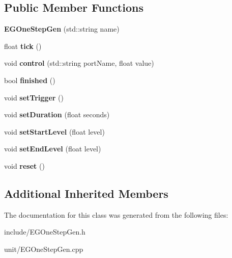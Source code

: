 \subsection*{Public Member Functions}
\begin{DoxyCompactItemize}
\item 
{\bfseries E\+G\+One\+Step\+Gen} (std\+::string name)\hypertarget{classunit_1_1EGOneStepGen_a9bc697acabed6c7b0467369ba073ede1}{}\label{classunit_1_1EGOneStepGen_a9bc697acabed6c7b0467369ba073ede1}

\item 
float {\bfseries tick} ()\hypertarget{classunit_1_1EGOneStepGen_a74df96649d7a66d19cb33bf9bf13f54a}{}\label{classunit_1_1EGOneStepGen_a74df96649d7a66d19cb33bf9bf13f54a}

\item 
void {\bfseries control} (std\+::string port\+Name, float value)\hypertarget{classunit_1_1EGOneStepGen_a8979594fb226c732a9b8232664f09047}{}\label{classunit_1_1EGOneStepGen_a8979594fb226c732a9b8232664f09047}

\item 
bool {\bfseries finished} ()\hypertarget{classunit_1_1EGOneStepGen_ae9f187e0f266559a80e4f4b534d79f78}{}\label{classunit_1_1EGOneStepGen_ae9f187e0f266559a80e4f4b534d79f78}

\item 
void {\bfseries set\+Trigger} ()\hypertarget{classunit_1_1EGOneStepGen_af94a0976e166a3f53b7bf14de58f81d6}{}\label{classunit_1_1EGOneStepGen_af94a0976e166a3f53b7bf14de58f81d6}

\item 
void {\bfseries set\+Duration} (float seconds)\hypertarget{classunit_1_1EGOneStepGen_aaf02138e168cad06cb955944f57ce93c}{}\label{classunit_1_1EGOneStepGen_aaf02138e168cad06cb955944f57ce93c}

\item 
void {\bfseries set\+Start\+Level} (float level)\hypertarget{classunit_1_1EGOneStepGen_af2b5bd8522fac9dc997d78d3750cdbbb}{}\label{classunit_1_1EGOneStepGen_af2b5bd8522fac9dc997d78d3750cdbbb}

\item 
void {\bfseries set\+End\+Level} (float level)\hypertarget{classunit_1_1EGOneStepGen_a3d58403aa5bebffeaf3f326855e0a233}{}\label{classunit_1_1EGOneStepGen_a3d58403aa5bebffeaf3f326855e0a233}

\item 
void {\bfseries reset} ()\hypertarget{classunit_1_1EGOneStepGen_a4898b08a0687e03802abdb7945708cab}{}\label{classunit_1_1EGOneStepGen_a4898b08a0687e03802abdb7945708cab}

\end{DoxyCompactItemize}
\subsection*{Additional Inherited Members}


The documentation for this class was generated from the following files\+:\begin{DoxyCompactItemize}
\item 
include/E\+G\+One\+Step\+Gen.\+h\item 
unit/E\+G\+One\+Step\+Gen.\+cpp\end{DoxyCompactItemize}

